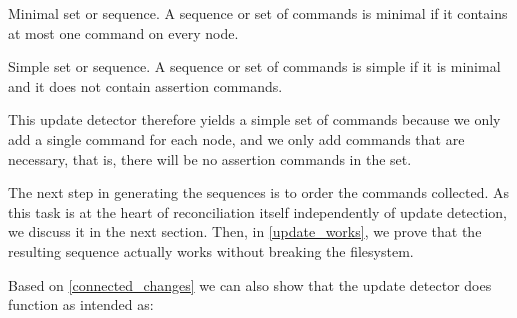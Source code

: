 \documentclass[12pt]{article}
\begin{document}
\begin{mydef}{Minimal set or sequence.}
A sequence or set of commands is minimal if it contains at most one command on every node.
\end{mydef}

\begin{mydef}{Simple set or sequence.}
A sequence or set of commands is simple if it is minimal and it does not contain assertion commands.
\end{mydef}

This update detector therefore yields a simple set of commands because we only add a single command
for each node, and we only add commands that are necessary, that is, there will be no 
assertion commands in the set.

The next step in generating the sequences is to order the commands collected.
As this task is at the heart of reconciliation itself independently of update detection,
we discuss it in the next section.
Then, in \cref{update_works}, we prove that the resulting sequence actually
works without breaking the filesystem.




\medskip


Based on \cref{connected_changes} we can also show that
the update detector does function as intended as:
\end{document}
